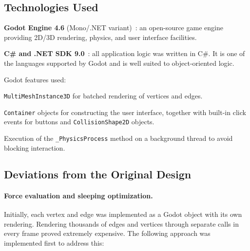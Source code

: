 \subsection{Technologies Used}

\begin{compactitem}
\item \textbf{Godot Engine 4.6} (Mono/.NET variant)~\cite{godot_engine}: an open-source game engine providing 2D/3D rendering, physics, and user interface facilities.
\item \textbf{C\# and .NET SDK 9.0}~\cite{dotnet9}: all application logic was written in C\#. It is one of the languages supported by Godot and is well suited to object-oriented logic.
\end{compactitem}

Godot features used:
\begin{compactitem}
\item \texttt{MultiMeshInstance3D} for batched rendering of vertices and edges.
\item \texttt{Container} objects for constructing the user interface, together with built-in click events for buttons and \texttt{CollisionShape2D} objects.
\item Execution of the \texttt{\_PhysicsProcess} method on a background thread to avoid blocking interaction.
\end{compactitem}

\subsection{Deviations from the Original Design}

\paragraph{Force evaluation and sleeping optimization.}
Initially, each vertex and edge was implemented as a Godot object with its own rendering.
Rendering thousands of edges and vertices through separate calls in every frame proved extremely expensive. The following approach was implemented first to address this:

